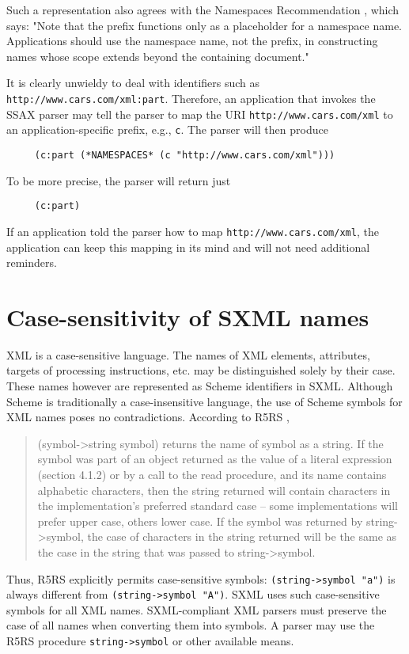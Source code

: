 \documentclass[10pt]{article}
\begin{document}
Such a representation also agrees with the Namespaces Recommendation \cite{XML Namespaces}, which says: "Note that the prefix
functions only as a placeholder for a namespace name. Applications
should use the namespace name, not the prefix, in constructing names
whose scope extends beyond the containing document."

It is clearly unwieldy to deal with identifiers such as \texttt{http://www.cars.com/xml:part}. Therefore, an application that
invokes the SSAX parser may tell the parser to map the URI \texttt{http://www.cars.com/xml} to an application-specific prefix, e.g., \texttt{c}. The parser will then produce\begin{verbatim}
     (c:part (*NAMESPACES* (c "http://www.cars.com/xml")))
\end{verbatim}
To be more precise, the parser will return just\begin{verbatim}
     (c:part)
\end{verbatim}
If an application told the parser how to map \texttt{http://www.cars.com/xml}, the application can keep this mapping in
its mind and will not need additional reminders.

\section{Case-sensitivity of SXML names}
XML is a case-sensitive language. The names of XML elements,
attributes, targets of processing instructions, etc. may be
distinguished solely by their case. These names however are
represented as Scheme identifiers in SXML. Although Scheme is
traditionally a case-insensitive language, the use of Scheme symbols
for XML names poses no contradictions. According to R5RS \cite{R5RS}, \begin{quote}
(symbol->string symbol) returns the name of symbol as a string. If
the symbol was part of an object returned as the value of a literal
expression (section 4.1.2) or by a call to the read procedure, and its
name contains alphabetic characters, then the string returned will
contain characters in the implementation's preferred standard
case -- some implementations will prefer upper case, others lower
case. If the symbol was returned by string->symbol, the case of
characters in the string returned will be the same as the case in the
string that was passed to string->symbol.\end{quote}


Thus, R5RS explicitly permits case-sensitive symbols: \texttt{(string->symbol "a")} is always different from \texttt{(string->symbol "A")}. SXML uses such case-sensitive symbols for
all XML names. SXML-compliant XML parsers must preserve the case of
all names when converting them into symbols. A parser may use the R5RS
procedure \texttt{string->symbol} or other available means.
\end{document}
